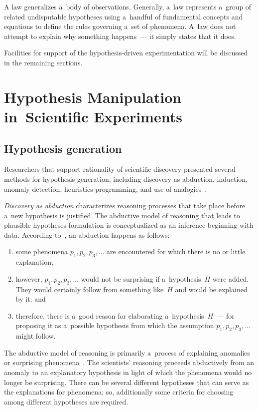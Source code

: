 \begin{multicols}{2}

  A law generalizes a~body of observations. Generally, a~law represents a~group of
related undisputable hypotheses using a~handful of fundamental concepts and
equations to define the rules governing a~set of phenomena. A~law does not attempt
to explain why something happens~--- it simply states that it does.

  Facilities for support of the hypothesis-driven experimentation will be discussed in
the remaining sections.

\section{Hypothesis Manipulation in~Scientific Experiments}

\subsection{Hypothesis generation}

  \noindent
  Researchers that support rationality of scientific discovery presented several
methods for hypothesis generation, including discovery as abduction, induction,
anomaly detection, heuristics programming, and use of analogies~\cite{14-kl}.

  \textit{Discovery as abduction} characterizes reasoning processes that take place
before a~new hypothesis is justified. The abductive model of reasoning that leads to
plausible hypotheses formulation is conceptualized as an inference beginning with
data. According to~\cite{15-kl}, an abduction happens as follows:
\begin{enumerate}[(1)]
\item some
phenomena $p_1, p_2, p_3,\ldots$ are encountered for which there is no or little
explanation;
\item however,  $p_1, p_2, p_3,\ldots$ would not be surprising if a~hypothesis~$H$ were added. They would certainly follow from something like~$H$
and would be explained by it; and
\item therefore, there is a~good reason for elaborating
a~hypothesis~$H$~--- for proposing it as a~possible hypothesis from which the
assumption $p_1, p_2, p_3,\ldots$ might follow.
\end{enumerate}
 The abductive model of reasoning is
primarily a~process of explaining anomalies or surprising phenomena~\cite{16-kl}.
The scientists' reasoning proceeds abductively from an anomaly to an explanatory
hypothesis in light of which the phenomena would no longer be surprising. There can
be several different hypotheses that can serve as the explanations for phenomena; so,
additionally some criteria for choosing among different hypotheses are required.


\end{multicols}
